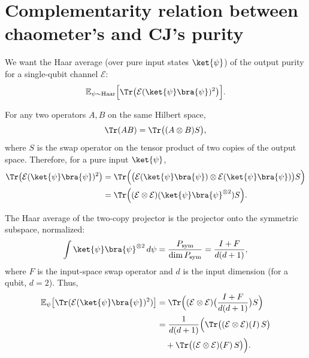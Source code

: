 \section{Complementarity relation between chaometer's and CJ's purity}
We want the Haar average (over pure input states $\ket{\psi}$) of the output
purity for a single-qubit channel $\mathcal{E}$:
\begin{equation}
\mathbb{E}_{\psi\sim \mathrm{Haar}}\Big[
\Tr\big(\mathcal{E}(\ket{\psi}\bra{\psi})^2\big)
\Big].
\end{equation}

For any two operators $A,B$ on the same Hilbert space,
\begin{equation}
\Tr(AB) = \Tr\big((A \otimes B) S \big),
\end{equation}
where $S$ is the swap operator on the tensor product of two copies of the
output space. Therefore, for a pure input $\ket{\psi}$,
\begin{equation}
\begin{aligned}
\Tr\big(\mathcal{E}(\ket{\psi}\bra{\psi})^2\big) 
&= \Tr\Big( \big( \mathcal{E}(\ket{\psi}\bra{\psi}) \otimes 
\mathcal{E}(\ket{\psi}\bra{\psi}) \big) S \Big) \\
%
&= \Tr\Big( (\mathcal{E} \otimes \mathcal{E})
(\ket{\psi}\bra{\psi}^{\otimes 2}) S \Big).
\end{aligned}
\end{equation}

The Haar average of the two-copy projector is the projector onto the
symmetric subspace, normalized:
\begin{equation}
\int \ket{\psi}\bra{\psi}^{\otimes 2} \, d\psi
= \frac{P_{\mathrm{sym}}}{\dim P_{\mathrm{sym}}}
= \frac{I + F}{d(d+1)},
\end{equation}
where $F$ is the input-space swap operator and $d$ is the input dimension
(for a qubit, $d=2$). Thus,
\begin{equation}
\begin{aligned}
\mathbb{E}_\psi \big[ \Tr(\mathcal{E}(\ket{\psi}\bra{\psi})^2) \big]
&= \Tr \Big( (\mathcal{E} \otimes \mathcal{E}) 
\big( \frac{I+F}{d(d+1)} \big) S \Big) \\
&= \frac{1}{d(d+1)} \Big(
\Tr\big( (\mathcal{E} \otimes \mathcal{E})(I) \, S \big) \\
&\quad + \Tr\big( (\mathcal{E} \otimes \mathcal{E})(F) \, S \big)
\Big).
\end{aligned}
\end{equation}

